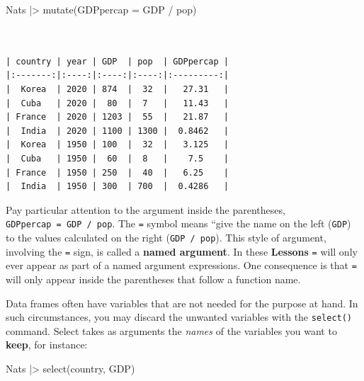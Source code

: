 \documentclass[
  letterpaper,
  DIV=11,
  numbers=noendperiod,
  oneside]{scrartcl}
\newenvironment{Shaded}{\begin{snugshade}}{\end{snugshade}}
\newcommand{\AttributeTok}[1]{\textcolor[rgb]{0.40,0.45,0.13}{#1}}
\newcommand{\FunctionTok}[1]{\textcolor[rgb]{0.28,0.35,0.67}{#1}}
\newcommand{\NormalTok}[1]{\textcolor[rgb]{0.00,0.23,0.31}{#1}}
\newcommand{\SpecialCharTok}[1]{\textcolor[rgb]{0.37,0.37,0.37}{#1}}
\begin{document}
\begin{Shaded}
\begin{Highlighting}[]
\NormalTok{Nats }\SpecialCharTok{|\textgreater{}} \FunctionTok{mutate}\NormalTok{(}\AttributeTok{GDPpercap =}\NormalTok{ GDP }\SpecialCharTok{/}\NormalTok{ pop)}
\end{Highlighting}
\end{Shaded}

\begin{verbatim}


| country | year | GDP  | pop  | GDPpercap |
|:-------:|:----:|:----:|:----:|:---------:|
|  Korea  | 2020 | 874  |  32  |   27.31   |
|  Cuba   | 2020 |  80  |  7   |   11.43   |
| France  | 2020 | 1203 |  55  |   21.87   |
|  India  | 2020 | 1100 | 1300 |  0.8462   |
|  Korea  | 1950 | 100  |  32  |   3.125   |
|  Cuba   | 1950 |  60  |  8   |    7.5    |
| France  | 1950 | 250  |  40  |   6.25    |
|  India  | 1950 | 300  | 700  |  0.4286   |
\end{verbatim}

Pay particular attention to the argument inside the parentheses,
\texttt{GDPpercap\ =\ GDP\ /\ pop}. The \texttt{=} symbol means ``give
the name on the left (\texttt{GDP}) to the values calculated on the
right (\texttt{GDP\ /\ pop}). This style of argument, involving the
\texttt{=} sign, is called a \textbf{named argument}. In these
\textbf{Lessons} \texttt{=} will only ever appear as part of a named
argument expressions. One consequence is that \texttt{=} will only
appear inside the parentheses that follow a function name.

\begin{tcolorbox}[enhanced jigsaw, colbacktitle=quarto-callout-note-color!10!white, opacityback=0, breakable, opacitybacktitle=0.6, colback=white, coltitle=black, arc=.35mm, title={4. select()}, left=2mm, colframe=quarto-callout-note-color-frame, rightrule=.15mm, bottomrule=.15mm, leftrule=.75mm, bottomtitle=1mm, toptitle=1mm, titlerule=0mm, toprule=.15mm]

\end{tcolorbox}

Data frames often have variables that are not needed for the purpose at
hand. In such circumstances, you may discard the unwanted variables with
the \texttt{select()} command. Select takes as arguments the
\emph{names} of the variables you want to \textbf{keep}, for instance:

\begin{Shaded}
\begin{Highlighting}[]
\NormalTok{Nats }\SpecialCharTok{|\textgreater{}} \FunctionTok{select}\NormalTok{(country, GDP)}
\end{Highlighting}
\end{Shaded}
\end{document}
